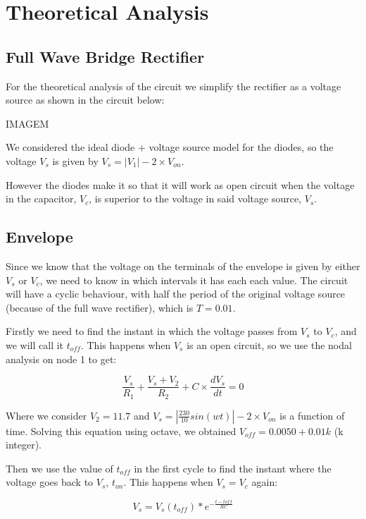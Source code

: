 \section{Theoretical Analysis}
\label{sec:analysis}

\subsection{Full Wave Bridge Rectifier}
For the theoretical analysis of the circuit we simplify the rectifier as a voltage source as shown in the circuit below:

IMAGEM

We considered the ideal diode + voltage source model for the diodes, so the voltage $V_s$ is given by $V_s= |V_1|-2\times V_{on}$.
\par
However the diodes make it so that it will work as open circuit when the voltage in the capacitor, $V_c$, is superior to the voltage in said voltage source, $V_s$.

\subsection{Envelope}
Since we know that the voltage on the terminals of the envelope is given by either $V_s$ or $V_c$, we need to know in which intervals it has each each value. The circuit will have a cyclic behaviour, with half the period of the original voltage source (because of the full wave rectifier), which is $T=0.01$.
\par
Firstly we need to find the instant in which the voltage passes from $V_s$ to $V_c$, and we will call it $t_{off}$. This happens when $V_s$ is an open circuit, so we use the nodal analysis on node 1 to get:

\begin{equation}\label{eq:t_off}
\frac{V_s}{R_1}+\frac{V_s+V_2}{R_2}+C\times\frac{dV_s}{dt}=0
\end{equation}

Where we consider $V_2=11.7$ and $V_s=|\frac{230}{10} sin(wt)|-2\times V_{on}$ is a function of time. Solving this equation using octave, we obtained $V_{off}=0.0050 + 0.01k$ (k integer).
\par
Then we use the value of $t_{off}$ in the first cycle to find the instant where the voltage goes back to $V_s$, $t_{on}$. This happens when $V_s=V_c$ again:

\begin{equation}\label{eq:t_on}
V_s=V_s(t_{off})*e^{-\frac{t-t{off}}{RC}}
\end{equation}

